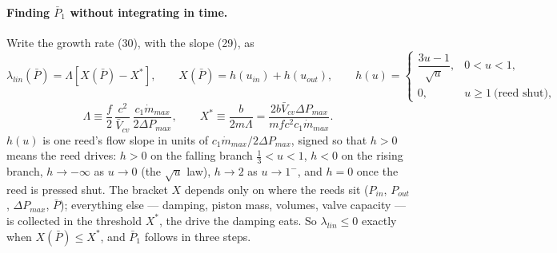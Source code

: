 \paragraph{Finding $\bar P_1$ without integrating in time.} Write the growth rate (30), with the slope (29), as
\begin{equation}
\lambda_{lin}(\bar P) = \Lambda\left[X(\bar P) - X^*\right], \qquad X(\bar P) = h(u_{in}) + h(u_{out}), \qquad
h(u) = \begin{cases} \dfrac{3u-1}{\sqrt u}, & 0 < u < 1, \\[6pt] 0, & u \ge 1 \ \text{(reed shut)}, \end{cases} \tag{32a}
\end{equation}
\begin{equation}
\Lambda \equiv \frac{f}{2}\,\frac{c^2}{\bar V_{cv}}\,\frac{c_1\dot m_{max}}{2\Delta P_{max}}, \qquad
X^* \equiv \frac{b}{2m\Lambda} = \frac{2b\bar V_{cv}\Delta P_{max}}{m f c^2 c_1\dot m_{max}} . \tag{32b}
\end{equation}
$h(u)$ is one reed's flow slope in units of $c_1\dot m_{max}/2\Delta P_{max}$, signed so that $h > 0$ means the reed drives: $h > 0$ on the falling branch $\tfrac13 < u < 1$, $h < 0$ on the rising branch, $h \to -\infty$ as $u \to 0$ (the $\sqrt u$ law), $h \to 2$ as $u \to 1^-$, and $h = 0$ once the reed is pressed shut. The bracket $X$ depends only on where the reeds sit ($P_{in}$, $P_{out}$, $\Delta P_{max}$, $\bar P$); everything else --- damping, piston mass, volumes, valve capacity --- is collected in the threshold $X^*$, the drive the damping eats. So $\lambda_{lin} \le 0$ exactly when $X(\bar P) \le X^*$, and $\bar P_1$ follows in three steps.

